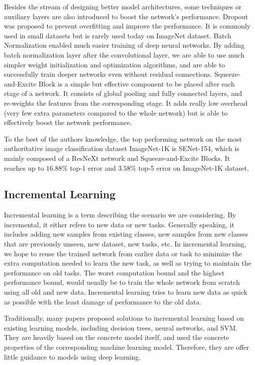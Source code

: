 Besides the stream of designing better model architectures, some techniques or auxiliary layers are also introduced to boost the network's performance. Dropout\cite{srivastava2014dropout} was proposed to prevent overfitting and improve the performance. It is commonly used in small datasets but is rarely used today on ImageNet dataset. Batch Normalization\cite{ioffe2015batch} enabled much easier training of deep neural networks. By adding batch normalization layer after the convolutional layer, we are able to use much simpler weight initialization and optimization algorithms, and are able to successfully train deeper networks even without residual connections\cite{he2016deep}. Squeeze-and-Excite Block\cite{hu2017squeeze} is a simple but effective component to be placed after each stage of a network. It consists of global pooling and fully connected layers, and re-weights the features from the corresponding stage. It adds really low overhead (very few extra parameters compared to the whole network) but is able to effectively boost the network performance.

To the best of the authors knowledge, the top performing network on the most authoritative image classification dataset ImageNet-1K is SENet-154\cite{hu2017squeeze}, which is mainly composed of a ResNeXt network and Squeeze-and-Excite Blocks. It reaches up to $16.88\%$ top-1 error and $3.58\%$ top-5 error on ImageNet-1K dataset.

\subsection{Incremental Learning}
Incremental learning is a term describing the scenario we are considering. By incremental, it either refers to new data or new tasks. Generally speaking, it includes adding new samples from existing classes, new samples from new classes that are previously unseen, new dataset, new tasks, etc. In incremental learning, we hope to reuse the trained network from earlier data or task to minimize the extra computation needed to learn the new task, as well as trying to maintain the performance on old tasks. The worst computation bound and the highest performance bound, would usually be to train the whole network from scratch using all old and new data. Incremental learning tries to learn new data as quick as possible with the least damage of performance to the old data.

Traditionally, many papers proposed solutions to incremental learning based on existing learning models, including decision trees\cite{utgoff1989incremental}, neural networks\cite{polikar2001learn++}, and SVM\cite{diehl2003svm}. They are heavily based on the concrete model itself, and used the concrete properties of the corresponding machine learning model. Therefore, they are offer little guidance to models using deep learning.

